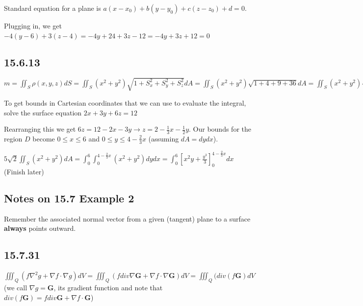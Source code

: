 \documentclass{article}
\begin{document}
\par\noindent\Large Standard equation for a plane is $a(x - x_{0}) + b(y - y_{0}) + c(z - z_{0}) + d = 0$.
\par\noindent\Large Plugging in, we get $-4(y - 6) + 3(z - 4) = -4y + 24 + 3z - 12 = -4y + 3z + 12 = 0$

\subsection{15.6.13}
\par\noindent\Large $m = \iint_{S}\rho(x, y, z)dS = \iint_{S}(x^{2} + y^{2})\sqrt{1 + S_{x}^{2} + S_{y}^{2} + S_{z}^{2}}dA = \iint_{S}(x^{2} + y^{2})\sqrt{1 + 4 + 9 + 36}dA = \iint_{S}(x^{2} + y^{2})\sqrt{50}dA = 5\sqrt{2}\iint_{S}(x^{2} + y^{2})dA$\vspace{0.25cm}

\par\noindent\Large To get bounds in Cartesian coordinates that we can use to evaluate the integral, solve the surface equation $2x + 3y + 6z = 12$
\par\noindent\Large Rearranging this we get $6z = 12 - 2x - 3y \rightarrow z = 2 - \frac{1}{3}x - \frac{1}{2}y$.  Our bounds for the region $D$ become $0 \leq x \leq 6$ and $0 \leq y \leq 4 - \frac{2}{3}x$ (assuming $dA = dydx$).\vspace{0.25cm}

\par\noindent\Large $5\sqrt{2}\iint_{S}(x^{2} + y^{2})dA = \int_{0}^{6}\int_{0}^{4 - \frac{2}{3}x}(x^{2} + y^{2})dydx = \int_{0}^{6}[x^{2}y + \frac{y^{3}}{3}]_{0}^{4 - \frac{2}{3}x}dx$ (Finish later)

\subsection{Notes on 15.7 Example 2}

\par\noindent\Large Remember the associated normal vector from a given (tangent) plane to a surface \textbf{always} points outward.

\subsection{15.7.31}
\par\noindent\Large $\iiint_{Q}(f\nabla^{2}g + \nabla f\cdot\nabla g)dV = \iiint_{Q}(fdiv\nabla\textbf{G} + \nabla f\cdot\nabla\textbf{G})dV = \iiint_{Q}(div(f\textbf{G})dV$ (we call $\nabla g = \textbf{G}$, its gradient function and note that $div(f\textbf{G}) = fdiv\textbf{G} + \nabla f \cdot \textbf{G}$)\vspace{0.25cm}
\end{document}
